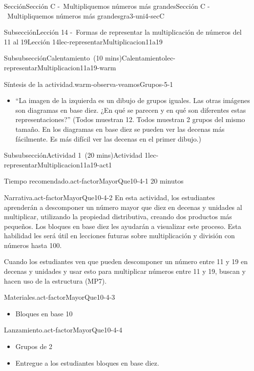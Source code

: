 \documentclass[oneside,10pt,]{article}
\begin{document}
\begin{sectionptx}{Sección}{Sección C -~Multipliquemos números más grandes}{}{Sección C -~Multipliquemos números más grandes}{}{}{gra3-uni4-secC}
\begin{subsectionptx}{Subsección}{Lección 14 -~Formas de representar la multiplicación de números del 11 al 19}{}{Lección 14}{}{}{lec-representarMultiplicacion11a19}
\begin{subsubsectionptx}{Subsubsección}{Calentamiento~(10 mins)}{}{Calentamiento}{}{}{lec-representarMultiplicacion11a19-warm}
\begin{paragraphs}{Síntesis de la actividad.}{warm-observa-veamosGrupos-5-1}
\begin{itemize}[label=\textbullet]
\item{}``La imagen de la izquierda es un dibujo de grupos iguales. Las otras imágenes son diagramas en base diez. ¿En qué se parecen y en qué son diferentes estas representaciones?'' (Todos muestran 12. Todos muestran 2 grupos del mismo tamaño. En los diagramas en base diez se pueden ver las decenas más fácilmente. Es más difícil ver las decenas en el primer dibujo.)%
\end{itemize}
\end{paragraphs}%
\end{subsubsectionptx}
%
%
\typeout{************************************************}
\typeout{************************************************}
%
\begin{subsubsectionptx}{Subsubsección}{Actividad 1~(20 mins)}{}{Actividad 1}{}{}{lec-representarMultiplicacion11a19-act1}
\par
\begin{paragraphs}{Tiempo recomendado.}{act-factorMayorQue10-4-1}%
20 minutos%
\end{paragraphs}%
\begin{paragraphs}{Narrativa.}{act-factorMayorQue10-4-2}%
En esta actividad, los estudiantes aprenderán a descomponer un número mayor que diez en decenas y unidades al multiplicar, utilizando la propiedad distributiva, creando dos productos más pequeños. Los bloques en base diez les ayudarán a visualizar este proceso. Esta habilidad les será útil en lecciones futuras sobre multiplicación y división con números hasta 100.%
\par
Cuando los estudiantes ven que pueden descomponer un número entre 11 y 19 en decenas y unidades y usar esto para multiplicar números entre 11 y 19, buscan y hacen uso de la estructura (MP7).%
\end{paragraphs}%
\begin{paragraphs}{Materiales.}{act-factorMayorQue10-4-3}%
%
\begin{itemize}[label=\textbullet]
\item{}Bloques en base 10%
\end{itemize}
\end{paragraphs}%
\begin{paragraphs}{Lanzamiento.}{act-factorMayorQue10-4-4}%
%
\begin{itemize}[label=\textbullet]
\item{}Grupos de 2%
\item{}Entregue a los estudiantes bloques en base diez.%
\end{itemize}

\end{paragraphs}
\end{subsubsectionptx}
\end{subsectionptx}
\end{sectionptx}
\end{document}
